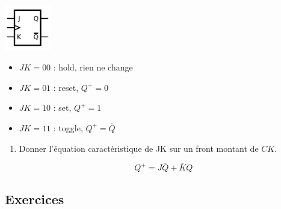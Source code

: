 \documentclass[a4paper,10pt]{exam}
\begin{document}
\begin{minipage}{0.4\textwidth}
\includegraphics[width=2cm]{JKflipflop}
\end{minipage}
\begin{minipage}{0.4\textwidth}
\begin{itemize}
  \item $JK=00$ : hold, rien ne change
  \item $JK=01$ : reset, $Q^{+}= 0$
  \item $JK=10$ : set, $Q^{+}= 1$
  \item $JK=11$ : toggle, $Q^{+} = \overline{Q}$
\end{itemize}
\end{minipage}

\begin{enumerate}
  \item Donner l'équation caractéristique de JK sur un front montant de $CK$.
    \begin{solution}
      $$Q^{+} = J\overline{Q} + \overline{K}Q$$
    \end{solution}
\end{enumerate}

\subsection{Exercices}
\end{document}
